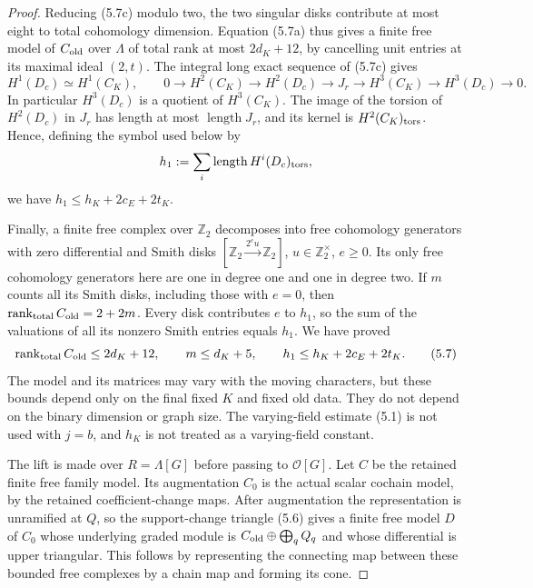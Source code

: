 \documentclass[11pt]{article}
\theoremstyle{definition}
\theoremstyle{remark}
\providecommand{\mathscr}[1]{\mathcal{#1}}
\begin{document}
\begin{proof}
Reducing (5.7c) modulo two, the two singular disks contribute at
most eight to total cohomology dimension. Equation (5.7a) thus
gives a finite free model of $C_{\rm old}$ over $\Lambda$ of
total rank at most $2d_K+12$, by cancelling unit entries at its
maximal ideal $(2,t)$. The integral long exact sequence of
(5.7c) gives
\[
 H^1(D_c)\simeq H^1(C_K),\qquad
 0\to H^2(C_K)\to H^2(D_c)\to J_r
       \to H^3(C_K)\to H^3(D_c)\to0.                         \tag{5.7d}
\]
In particular $H^3(D_c)$ is a quotient of $H^3(C_K)$.
The image of the torsion of $H^2(D_c)$ in $J_r$ has length at
most $\operatorname{length}J_r$, and its kernel is
$H^2(C_K)_{\rm tors}$. Hence, defining the symbol used below by
\[
             h_1:=\sum_i\operatorname{length}H^i(D_c)_{\rm tors},
\]
we have $h_1\le h_K+2c_E+2t_K$.

Finally, a finite free complex over $\mathbb Z_2$ decomposes
into free cohomology generators with zero differential and
Smith disks $[\mathbb Z_2\xrightarrow{2^e u}\mathbb Z_2]$,
$u\in\mathbb Z_2^\times$, $e\ge0$. Its only free cohomology
generators here are one in degree one and one in degree two.
If $m$ counts all its Smith disks, including those with $e=0$,
then $\operatorname{rank}_{\rm total}C_{\rm old}=2+2m$.
Every disk contributes $e$ to $h_1$, so the sum of the valuations
of all its nonzero Smith entries equals $h_1$. We have proved
\[
 \operatorname{rank}_{\rm total}C_{\rm old}\le2d_K+12,\qquad
 m\le d_K+5,\qquad h_1\le h_K+2c_E+2t_K.                     \tag{5.7}
\]
The model and its matrices may vary with the moving characters,
but these bounds depend only on the final fixed $K$ and fixed
old data. They do not depend on the binary dimension or graph
size. The varying-field estimate (5.1) is not used with $j=b$,
and $h_K$ is not treated as a varying-field constant.

The lift is made over $R=\Lambda[G]$ before passing to
$\mathscr O[G]$. Let $C$ be the retained finite free family model.
Its augmentation $C_0$ is the actual scalar cochain model, by the
retained coefficient-change maps. After augmentation the representation
is unramified at $Q$, so the support-change triangle (5.6) gives a
finite free model $D$ of $C_0$ whose underlying graded module is
$C_{\rm old}\oplus\bigoplus_q Q_q$ and whose differential is upper
triangular. This follows by representing the connecting map between
these bounded free complexes by a chain map and forming its cone.


\end{proof}
\end{document}
